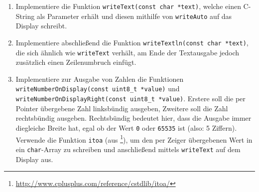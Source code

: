 \begin{enumerate}
\item 
Implementiere die Funktion \lstinline|writeText(const char *text)|, welche einen C-String als Parameter erhält und diesen mithilfe von \lstinline|writeAuto| auf das Display schreibt.

\item 
Implementiere abschließend die Funktion \lstinline|writeTextln(const char *text)|, die sich ähnlich wie \lstinline|writeText| verhält, am Ende der Textausgabe jedoch zusätzlich einen Zeilenumbruch einfügt.

\item 
Implementiere zur Ausgabe von Zahlen die Funktionen \lstinline|writeNumberOnDisplay(const uint8_t *value)| und \lstinline|writeNumberOnDisplayRight(const uint8_t *value)|.
Erstere soll die per Pointer übergebene Zahl linksbündig ausgeben, Zweitere soll die Zahl rechtsbündig ausgeben.
Rechtsbündig bedeutet hier, dass die Ausgabe immer diegleiche Breite hat, egal ob der Wert \lstinline|0| oder \lstinline|65535| ist (also: 5 Ziffern).
Verwende die Funktion \lstinline|itoa| (aus \footnote{\url{http://www.cplusplus.com/reference/cstdlib/itoa/}}), um den per Zeiger übergebenen Wert in ein \lstinline|char|-Array zu schreiben und anschließend mittels \lstinline|writeText| auf dem Display aus.
\end{enumerate}


